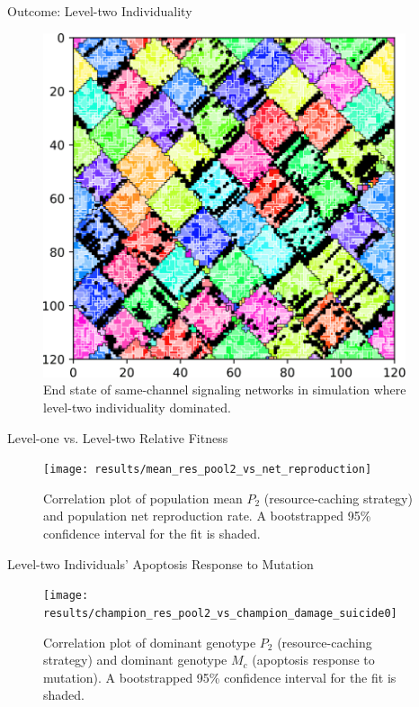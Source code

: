 \begin{frame}{Outcome: Level-two Individuality}
\begin{figure}
\begin{columns}
\begin{column}{0.6\textwidth}
\includegraphics[width=\textwidth]{img/results/ChannelMap_1047_update19500000.png}
\end{column}
\begin{column}{0.4\textwidth}
\caption{
End state of same-channel signaling networks in simulation where level-two individuality dominated.
}
\end{column}
\end{columns}
\end{figure}
\end{frame}

\begin{frame}{Level-one vs. Level-two Relative Fitness}

\begin{figure}
\texttt{[image: results/mean\_res\_pool2\_vs\_net\_reproduction]}
\caption{
Correlation plot of population mean $P_2$ (resource-caching strategy) and population net reproduction rate.
A bootstrapped 95\% confidence interval for the fit is shaded.
}
\end{figure}

\end{frame}

\begin{frame}{Level-two Individuals' Apoptosis Response to Mutation}

\begin{figure}
\texttt{[image: results/champion\_res\_pool2\_vs\_champion\_damage\_suicide0]}
\caption{
Correlation plot of dominant genotype $P_2$ (resource-caching strategy) and dominant genotype $M_{c}$ (apoptosis response to mutation).
A bootstrapped 95\% confidence interval for the fit is shaded.
}
\end{figure}

\end{frame}
